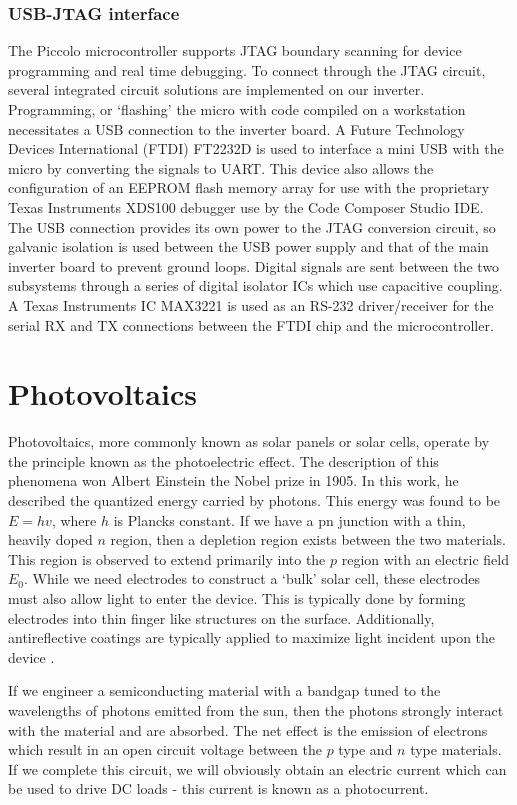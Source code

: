 \subsubsection{USB-JTAG interface}
The Piccolo microcontroller supports JTAG boundary scanning for device programming and real time debugging. To connect through the JTAG circuit, several integrated circuit solutions are implemented on our inverter. Programming, or 
`flashing' the micro with code compiled on a workstation necessitates a USB connection to the inverter board. A Future Technology Devices International (FTDI) FT2232D is used to interface a mini USB with the micro by converting the signals to UART. This device also allows the configuration of an EEPROM flash memory array for use with the proprietary Texas Instruments XDS100 debugger use by the Code Composer Studio IDE. The USB connection provides its own power to the JTAG conversion circuit, so galvanic isolation is used between the USB power supply and that of the main inverter board to prevent ground loops. Digital signals are sent between the two subsystems through a series of digital isolator ICs which use capacitive coupling. A Texas Instruments IC MAX3221 is used as an RS-232 driver/receiver for the serial RX and TX connections between the FTDI chip and the microcontroller.

\section{Photovoltaics}
Photovoltaics, more commonly known as solar panels or solar cells, operate by the principle known as the photoelectric effect. The description of this phenomena won Albert Einstein the Nobel prize in 1905. In this work, he described the quantized energy carried by photons. This energy was found to be $E=hv$, where $h$ is Plancks constant. If we have a pn junction with a thin, heavily doped $n$ region, then a depletion region exists between the two materials. This region is observed to extend primarily into the $p$ region with an electric field $E_0$. While we need electrodes to construct a `bulk' solar cell, these electrodes must also allow light to enter the device. This is typically done by forming electrodes into thin finger like structures on the surface. Additionally, antireflective coatings are typically applied to maximize light incident upon the device \cite{materials}.

If we engineer a semiconducting material with a bandgap tuned to the wavelengths of photons emitted from the sun, then the photons strongly interact with the material and are absorbed. The net effect is the emission of electrons which result in an open circuit voltage between the $p$ type and $n$ type materials. If we complete this circuit, we will obviously obtain an electric current which can be used to drive DC loads - this current is known as a photocurrent. 

